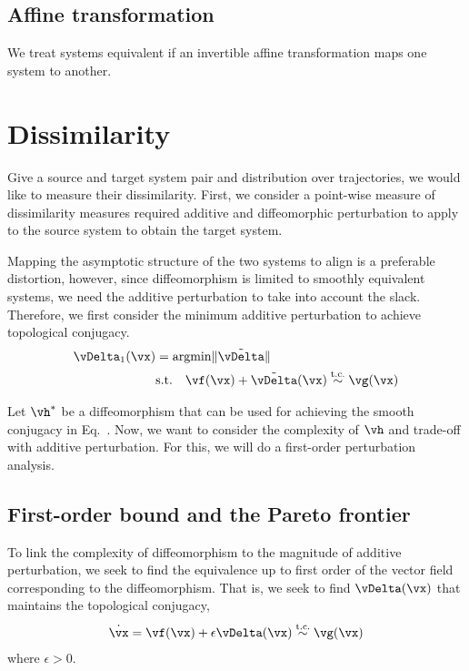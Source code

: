 \documentclass[a4paper,twoside]{article}
\renewcommand{\eqref}{Eq.~\originaleqref}
\newcounter{ct}
\DeclareMathOperator*{\argmin}{\rm argmin}
\DeclarePairedDelimiter{\norm}{\lVert}{\rVert}
\newcommand{\homeo}{\vh}
\begin{document}
\subsection{Affine transformation}
We treat systems equivalent if an invertible affine transformation maps one system to another.

\section{Dissimilarity}
Give a source and target system pair and distribution over trajectories, we would like to measure their dissimilarity.
First, we consider a point-wise measure of dissimilarity measures required additive and diffeomorphic perturbation to apply to the source system to obtain the target system.

Mapping the asymptotic structure of the two systems to align is a preferable distortion, however, since diffeomorphism is limited to smoothly equivalent systems, we need the additive perturbation to take into account the slack.
Therefore, we first consider the minimum additive perturbation to achieve topological conjugacy.
\begin{align}
    \vDelta_1(\vx) &= \argmin \norm{\tilde \vDelta}
    \label{eq:d1:min}
    \\
    & \text{s.t.} \quad
    \vf(\vx) + \tilde \vDelta(\vx)
    \overset{\text{t.c.}}{\sim}
    \vg(\vx)
    \label{eq:d1:tc}
\end{align}

Let $\homeo^\ast$ be a diffeomorphism that can be used for achieving the smooth conjugacy in \eqref{eq:d1:tc}.
Now, we want to consider the complexity of $\homeo$ and trade-off with additive perturbation.
For this, we will do a first-order perturbation analysis.

\subsection{First-order bound and the Pareto frontier}
To link the complexity of diffeomorphism to the magnitude of additive perturbation, we seek to find the equivalence up to first order of the vector field corresponding to the diffeomorphism.
That is, we seek to find $\vDelta(\vx)$ that maintains the topological conjugacy,
\begin{align}
    \dot\vx = \vf(\vx) + \epsilon \vDelta(\vx)
    \overset{\text{t.c.}}{\sim}
    \vg(\vx)
    \label{eq:pareto:tc}
\end{align}
where $\epsilon > 0$.
\end{document}
